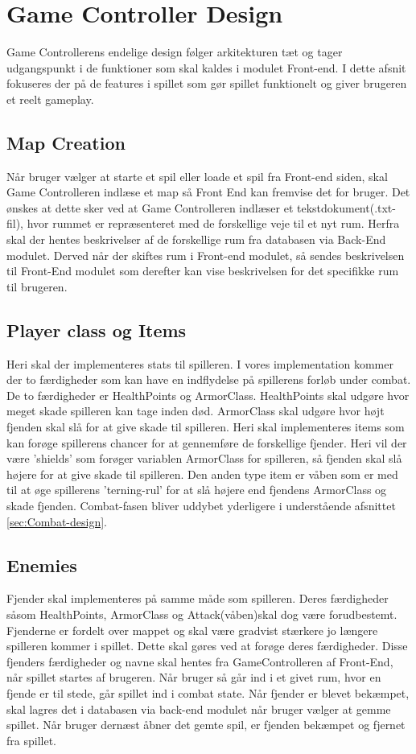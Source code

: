 \section{Game Controller Design}
Game Controllerens endelige design følger arkitekturen tæt og tager udgangspunkt i de funktioner som skal kaldes i modulet Front-end. I dette afsnit fokuseres der på de features i spillet som gør spillet funktionelt og giver brugeren et reelt gameplay.

\subsection{Map Creation}
Når bruger vælger at starte et spil eller loade et spil fra Front-end siden, skal Game Controlleren indlæse et map så Front End kan fremvise det for bruger. Det ønskes at dette sker ved at Game Controlleren indlæser et tekstdokument(.txt-fil), hvor rummet er repræsenteret med de forskellige veje til et nyt rum. Herfra skal der hentes beskrivelser af de forskellige rum fra databasen via Back-End modulet. Derved når der skiftes rum i Front-end modulet, så sendes beskrivelsen til Front-End modulet som derefter kan vise beskrivelsen for det specifikke rum til brugeren.

\subsection{Player class og Items}
\label{sec:Player class og Items}
Heri skal der implementeres stats til spilleren. I vores implementation kommer der to færdigheder som kan have en indflydelse på spillerens forløb under combat. De to færdigheder er HealthPoints og ArmorClass. HealthPoints skal udgøre hvor meget skade spilleren kan tage inden død. ArmorClass skal udgøre hvor højt fjenden skal slå for at give skade til spilleren. Heri skal implementeres items som kan forøge spillerens chancer for at gennemføre de forskellige fjender. Heri vil der være 'shields' som forøger variablen ArmorClass for spilleren, så fjenden skal slå højere for at give skade til spilleren. Den anden type item er våben som er med til at øge spillerens 'terning-rul' for at slå højere end fjendens ArmorClass og skade fjenden. Combat-fasen bliver uddybet yderligere i understående afsnittet \autoref{sec:Combat-design}.

\subsection{Enemies}
Fjender skal implementeres på samme måde som spilleren. Deres færdigheder såsom HealthPoints, ArmorClass og Attack(våben)skal dog være forudbestemt. Fjenderne er fordelt over mappet og skal være gradvist stærkere jo længere spilleren kommer i spillet. Dette skal gøres ved at forøge deres færdigheder. Disse fjenders færdigheder og navne skal hentes fra GameControlleren af Front-End, når spillet startes af brugeren. Når bruger så går ind i et givet rum, hvor en fjende er til stede, går spillet ind i combat state. Når fjender er blevet bekæmpet, skal lagres det i databasen via back-end modulet når bruger vælger at gemme spillet. Når bruger dernæst åbner det gemte spil, er fjenden bekæmpet og fjernet fra spillet.
